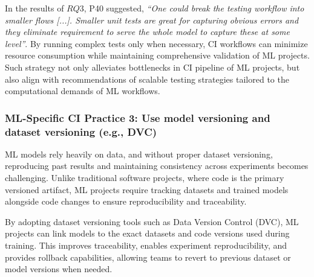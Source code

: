 In the results of $RQ3$, P40 suggested, \textit{``One could break the testing workflow into smaller flows [...]. Smaller unit tests are great for capturing obvious errors and they eliminate requirement to serve the whole model to capture these at some level''}.
By running complex tests only when necessary, CI workflows can minimize resource consumption while maintaining comprehensive validation of ML projects.
Such strategy not only alleviates bottlenecks in CI pipeline of ML projects, but also align with \cite{giray2021software} recommendations of scalable testing strategies tailored to the computational demands of ML workflows.

\subsubsection*{\textbf{ML-Specific CI Practice 3:} Use model versioning and dataset versioning (e.g., DVC)}

ML models rely heavily on data, and without proper dataset versioning, reproducing past results and maintaining consistency across experiments becomes challenging. Unlike traditional software projects, where code is the primary versioned artifact, ML projects require tracking datasets and trained models alongside code changes to ensure reproducibility and traceability.

By adopting dataset versioning tools such as Data Version Control (DVC), ML projects can link models to the exact datasets and code versions used during training. This improves traceability, enables experiment reproducibility, and provides rollback capabilities, allowing teams to revert to previous dataset or model versions when needed.

